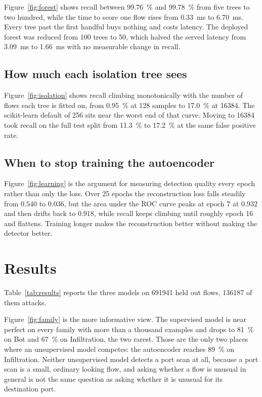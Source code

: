 \documentclass[9pt,a4paper,twocolumn]{article}
\begin{document}
Figure~\ref{fig:forest} shows recall between \SI{99.76}{\percent} and
\SI{99.78}{\percent} from five trees to two hundred, while the time to score one
flow rises from \SI{0.33}{\milli\second} to \SI{6.70}{\milli\second}. Every tree
past the first handful buys nothing and costs latency. The deployed forest was
reduced from 100 trees to 50, which halved the served latency from
\SI{3.09}{\milli\second} to \SI{1.66}{\milli\second} with no measurable change
in recall.

\subsection{How much each isolation tree sees}

Figure~\ref{fig:isolation} shows recall climbing monotonically with the number
of flows each tree is fitted on, from \SI{0.95}{\percent} at 128 samples to
\SI{17.0}{\percent} at \num{16384}. The scikit-learn default of 256 sits near
the worst end of that curve. Moving to \num{16384} took recall on the full test
split from \SI{11.3}{\percent} to \SI{17.2}{\percent} at the same false positive
rate.

\subsection{When to stop training the autoencoder}

Figure~\ref{fig:learning} is the argument for measuring detection quality every
epoch rather than only the loss. Over 25 epochs the reconstruction loss falls
steadily from $0.540$ to $0.036$, but the area under the ROC curve peaks at
epoch 7 at $0.932$ and then drifts back to $0.918$, while recall keeps climbing
until roughly epoch 16 and flattens. Training longer makes the reconstruction
better without making the detector better.

\section{Results}

Table~\ref{tab:results} reports the three models on \num{691941} held out
flows, \num{136187} of them attacks.

Figure~\ref{fig:family} is the more informative view. The supervised model is
near perfect on every family with more than a thousand examples and drops to
\SI{81}{\percent} on Bot and \SI{67}{\percent} on Infiltration, the two rarest.
Those are the only two places where an unsupervised model competes: the
autoencoder reaches \SI{89}{\percent} on Infiltration. Neither unsupervised
model detects a port scan at all, because a port scan is a small, ordinary
looking flow, and asking whether a flow is unusual in general is not the same
question as asking whether it is unusual for its destination port.
\end{document}
